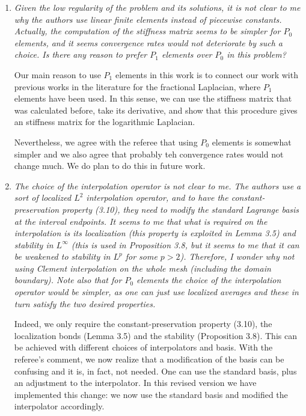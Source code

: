 \documentclass[11 pt]{article}
\numberwithin{equation}{section}
\begin{document}
\begin{enumerate}
    \item \emph{Given the low regularity of the problem and its solutions, it is not clear to me why the authors use linear finite elements instead of piecewise constants. Actually, the computation of the stiffness matrix seems to be simpler for \(P_{0}\) elements, and it seems convergence rates would not deteriorate by such a choice. Is there any reason to prefer \(P_{1}\) elements over \(P_{0}\) in this problem?}

    Our main reason to use $P_1$ elements in this work is to connect our work with previous works in the literature for the fractional Laplacian, where $P_1$ elements have been used. In this sense, we can use the stiffness matrix that was calculated before, take its derivative, and show that this procedure gives an stiffness matrix for the logarithmic Laplacian.

    Nevertheless, we agree with the referee that using $P_0$ elements is somewhat simpler and we also agree that probably teh convergence rates would not change much.  We do plan to do this in future work.



    \item \emph{The choice of the interpolation operator is not clear to me. The authors use a sort of localized \(L^{2}\) interpolation operator, and to have the constant-preservation property (3.10), they need to modify the standard Lagrange basis at the interval endpoints. It seems to me that what is required on the interpolation is its localization (this property is exploited in Lemma 3.5) and stability in \(L^{\infty}\) (this is used in Proposition 3.8, but it seems to me that it can be weakened to stability in \(L^{p}\) for some \(p>2\)). Therefore, I wonder why not using Clement interpolation on the whole mesh (including the domain boundary). Note also that for \(P_{0}\) elements the choice of the interpolation operator would be simpler, as one can just use localized averages and these in turn satisfy the two desired properties.}

    Indeed, we only require the constant-preservation property (3.10), the localization bonds (Lemma 3.5) and the stability (Proposition 3.8). This can be achieved with different choices of interpolators and basis. With the referee's comment, we now realize that a modification of the basis can be confusing and it is, in fact, not needed. One can use  the standard basis, plus an adjustment to the interpolator. In this revised version we have implemented this change: we now use the standard basis and modified the interpolator accordingly.


\end{enumerate}
\end{document}
